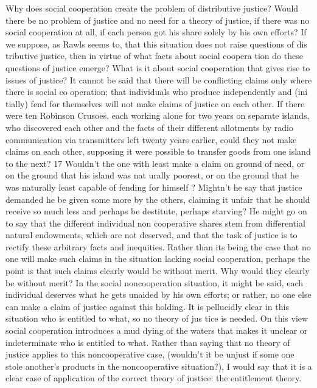\documentclass[11pt,openany]{book}
\begin{document}
Why does social cooperation create the problem of distributive justice? Would there be no problem of justice and no need for a theory of justice, if there was no social cooperation at all, if each person got his share solely by his own efforts? If we suppose, as Rawls seems to, that this situation does not raise questions of dis tributive justice, then in virtue of what facts about social coopera tion do these questions of justice emerge? What is it about social cooperation that gives rise to issues of justice? It cannot be said that there will be conflicting claims only where there is social co operation; that individuals who produce independently and (ini tially) fend for themselves will not make claims of justice on each other. If there were ten Robinson Crusoes, each working alone for two years on separate islands, who discovered each other and the facts of their different allotments by radio communication via transmitters left twenty years earlier, could they not make claims on each other, supposing it were possible to transfer goods from one island to the next? 17 Wouldn't the one with least make a claim on ground of need, or on the ground that his island was nat urally poorest, or on the ground that he was naturally least capable of fending for himself ? Mightn't he say that justice demanded he be given some more by the others, claiming it unfair that he should receive so much less and perhaps be destitute, perhaps starving? He might go on to say that the different individual non cooperative shares stem from differential natural endowments, which are not deserved, and that the task of justice is to rectify these arbitrary facts and inequities. Rather than its being the case that no one will make such claims in the situation lacking social cooperation, perhaps the point is that such claims clearly would be without merit. Why would they clearly be without merit? In the social noncooperation situation, it might be said, each individual deserves what he gets unaided by his own efforts; or rather, no one else can make a claim of justice against this holding. It is pellucidly clear in this situation who is entitled to what, so no theory of jus tice is needed. On this view social cooperation introduces a mud dying of the waters that makes it unclear or indeterminate who is entitled to what. Rather than saying that no theory of justice applies to this noncooperative case, (wouldn't it be unjust if some one stole another's products in the noncooperative situation?), I would say that it is a clear case of application of the correct theory of justice: the entitlement theory. 
\end{document}
